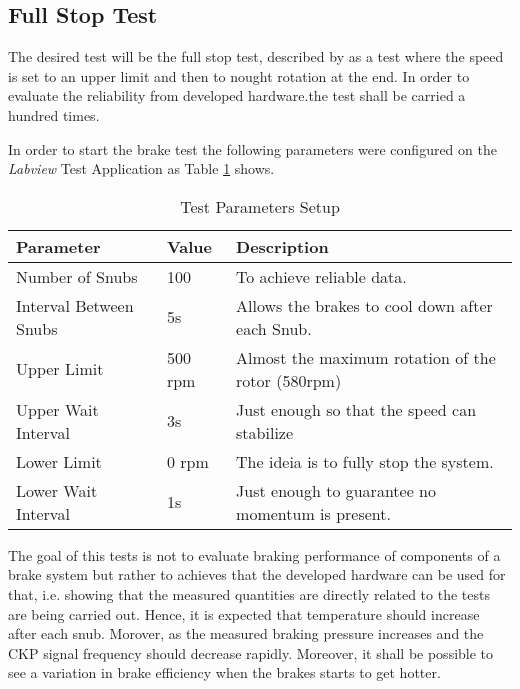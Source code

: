 \subsection{Full Stop Test}\label{ssec:full-stop-test}

		The desired test will be the full stop test, described by \cite{caixeta2017} as a test where the speed is set to an upper limit and then to nought rotation at the end. In order to evaluate the reliability from developed hardware.the test shall be carried a hundred times.

		\par
		In order to start the brake test the following parameters were configured on the \textit{Labview} Test Application as Table \ref{table:brake-test-parameters} shows.

		\begin{table}[h!]
			\centering
			\begin{tabular}{|l|l|l|}
				\hline
				\textbf{Parameter} & \textbf{Value} & \textbf{Description} \\ \hline
				Number of Snubs & 100 & To achieve reliable data. \\ \hline
				Interval Between Snubs & 5s & Allows the brakes to cool down after each Snub. \\ \hline
				Upper Limit & 500 rpm & Almost the maximum rotation of the rotor (580rpm) \\ \hline
				Upper Wait Interval & 3s & Just enough so that the speed can stabilize \\ \hline
				Lower Limit & 0 rpm & The ideia is to fully stop the system. \\ \hline
				Lower Wait Interval & 1s & Just enough to guarantee no momentum is present. \\ \hline
			\end{tabular}
			\caption{Test Parameters Setup}
			\label{table:brake-test-parameters}
		\end{table}

		The goal of this tests is not to evaluate braking performance of components of a brake system but rather to achieves that the developed hardware can be used for that, i.e. showing that the measured quantities are directly related to the tests are being carried out. Hence, it is expected that temperature should increase after each snub. Morover, as the measured braking pressure increases and the CKP signal frequency should decrease rapidly. Moreover, it shall be possible to see a variation in brake efficiency when the brakes starts to get hotter.